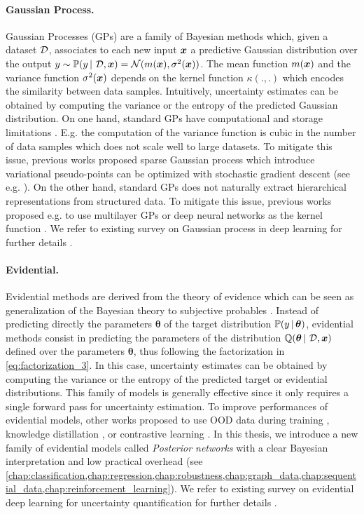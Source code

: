 \paragraph*{Gaussian Process.} Gaussian Processes (GPs) are a family of Bayesian methods which, given a dataset $\operatorname{\mathcal{D}}$, associates to each new input $\bm{x}$ a predictive Gaussian distribution over the output $y \sim \mathbb{P}(y \,|\, \operatorname{\mathcal{D}}, \bm{x}) = \operatorname{\mathcal{N}}(m(\bm{x}), \sigma^2(\bm{x}))$. The mean function $m(\bm{x})$ and the variance function $\sigma^2(\bm{x})$ depends on the kernel function $\kappa(.,.)$ which encodes the similarity between data samples. Intuitively, uncertainty estimates can be obtained by computing the variance or the entropy of the predicted Gaussian distribution.
On one hand, standard GPs have computational and storage limitations \cite{jakkala2021deepgp}. E.g. the computation of the variance function is cubic in the number of data samples which does not scale well to large datasets. To mitigate this issue, previous works proposed sparse Gaussian process which introduce variational pseudo-points can be optimized with stochastic gradient descent (see e.g. \cite{snelson2005sparse,titsias2010gplvm,due}).
On the other hand, standard GPs does not naturally extract hierarchical representations from structured data. To mitigate this issue, previous works proposed e.g. to use multilayer GPs \cite{damianou2012deepgp} or deep neural networks as the kernel function \cite{wilson2016stochastic}. We refer to existing survey on Gaussian process in deep learning for further details \citep{gp-for-ml,damianou2012deepgp,jakkala2021deepgp}.

\paragraph*{Evidential.} Evidential methods are derived from the theory of evidence which can be seen as generalization of the Bayesian theory to subjective probables \cite{dempster1968evidence,shafer1976mathematical}. Instead of predicting directly the parameters $\bm{\theta}$ of the target distribution $\mathbb{P}(y \,|\, \bm{\theta})$, evidential methods consist in predicting the parameters of the distribution $\operatorname{\mathbb{Q}}(\bm{\theta} \,|\, \operatorname{\mathcal{D}}, \bm{x})$ defined over the parameters $\bm{\theta}$, thus following the factorization in \cref{eq:factorization_3}. In this case, uncertainty estimates can be obtained by computing the variance or the entropy of the predicted target or evidential distributions. This family of models is generally effective since it only requires a single forward pass for uncertainty estimation. To improve performances of evidential models, other works proposed to use OOD data during training \cite{PriorNetworks,reverse-kl}, knowledge distillation \cite{distribution-distillation}, or contrastive learning \cite{uncertainty-generative-classifier}. In this thesis, we introduce a new family of evidential models called \emph{Posterior networks} with a clear Bayesian interpretation and low practical overhead (see \cref{chap:classification,chap:regression,chap:robustness,chap:graph_data,chap:sequential_data,chap:reinforcement_learning}). We refer to existing survey on evidential deep learning for uncertainty quantification for further details \citep{survey_evidential_uncertainty}.

